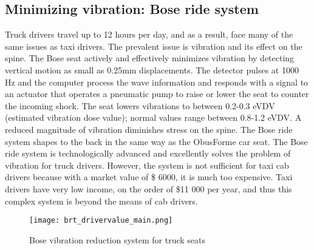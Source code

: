 \documentclass[11pt]{article}
\begin{document}
\subsection{Minimizing vibration: Bose ride system}
Truck drivers travel up to 12 hours per day, and as a result, face many of the same issues as taxi drivers. 
The prevalent issue is vibration and its effect on the spine. The Bose seat actively and effectively minimizes vibration 
by detecting vertical motion as small as 0.25mm displacements. %
The detector pulses at 1000 Hz and the computer process the 
wave information and responds with a signal to an actuator that operates a pneumatic pump to raise or lower the seat to 
counter the incoming shock. The seat lowers vibrations to between 0.2-0.3 eVDV (estimated vibration dose value); normal values range 
between 0.8-1.2 eVDV\cite{Bosetruckseat}. A reduced magnitude of
vibration diminishes stress on the spine. The Bose ride system shapes
to the back in the same way as the 
ObusForme car seat\cite{Bosetruckseat}. The Bose ride system is 
technologically advanced and excellently solves the problem of
vibration for truck drivers. However, the system is not sufficient for taxi cab
drivers because with a market value of \$ 6000\cite{Bosetruckseat}, it is much too expensive. Taxi drivers have very low
income, on the order of \$11 000 per year\cite{iTaxiWorkers2012}, and thus this complex
system is beyond the means of cab drivers.
\begin{figure}[h]
  \centering
  \texttt{[image: brt\_drivervalue\_main.png]}
  \caption{Bose vibration reduction system for truck seats}
\end{figure}
\end{document}
